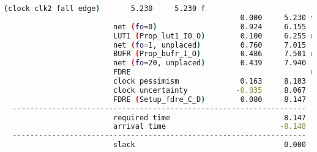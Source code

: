 \documentclass{article}
\begin{document}
\begin{lstlisting}[language=bash]
                         (clock clk2 fall edge)       5.230     5.230 f  
                                                      0.000     5.230 f  dev_data_clk_in[DATA_CLK_P] (IN)
                         net (fo=0)                   0.924     6.155    worker/dev_data_clk_in[DATA_CLK_P]
                         LUT1 (Prop_lut1_I0_O)        0.100     6.255 r  worker/dac_clk_bufr_i_1/O
                         net (fo=1, unplaced)         0.760     7.015    worker/dac_dev_data_clk_p
                         BUFR (Prop_bufr_I_O)         0.486     7.501 r  worker/dac_clk_bufr/O
                         net (fo=20, unplaced)        0.439     7.940    worker/dac_clk
                         FDRE                                         r  worker/data_mode_lvds.dac_data_ddr_first_r_reg[0]/C
                         clock pessimism              0.163     8.103    
                         clock uncertainty           -0.035     8.067    
                         FDRE (Setup_fdre_C_D)        0.080     8.147    worker/data_mode_lvds.dac_data_ddr_first_r_reg[0]
  -------------------------------------------------------------------
                         required time                          8.147    
                         arrival time                          -8.148    
  -------------------------------------------------------------------
                         slack                                  0.000    
\end{lstlisting}
\end{document}

